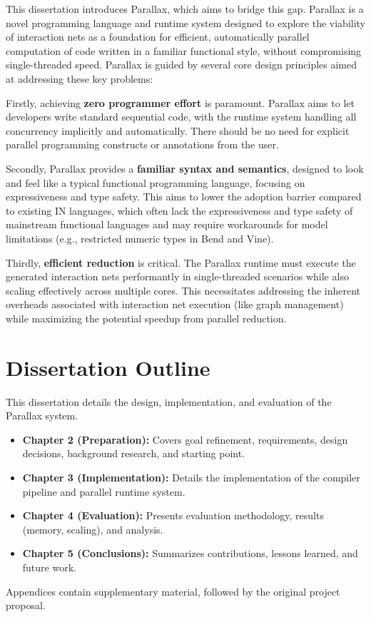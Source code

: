 This dissertation introduces Parallax, which aims to bridge this gap. Parallax is a novel programming language and runtime system designed to explore the viability of interaction nets as a foundation for efficient, automatically parallel computation of code written in a familiar functional style, without compromising single-threaded speed. Parallax is guided by several core design principles aimed at addressing these key problems:

Firstly, achieving \textbf{zero programmer effort} is paramount. Parallax aims to let developers write standard sequential code, with the runtime system handling all concurrency implicitly and automatically. There should be no need for explicit parallel programming constructs or annotations from the user.

Secondly, Parallax provides a \textbf{familiar syntax and semantics}, designed to look and feel like a typical functional programming language, focusing on expressiveness and type safety. This aims to lower the adoption barrier compared to existing IN languages, which often lack the expressiveness and type safety of mainstream functional languages and may require workarounds for model limitations (e.g., restricted numeric types in Bend and Vine).

Thirdly, \textbf{efficient reduction} is critical. The Parallax runtime must execute the generated interaction nets performantly in single-threaded scenarios while also scaling effectively across multiple cores. This necessitates addressing the inherent overheads associated with interaction net execution (like graph management) while maximizing the potential speedup from parallel reduction.

\section{Dissertation Outline}
This dissertation details the design, implementation, and evaluation of the Parallax system. 
\begin{itemize}
    \item \textbf{Chapter 2 (Preparation):} Covers goal refinement, requirements, design decisions, background research, and starting point.
    \item \textbf{Chapter 3 (Implementation):} Details the implementation of the compiler pipeline and parallel runtime system.
    \item \textbf{Chapter 4 (Evaluation):} Presents evaluation methodology, results (memory, scaling), and analysis.
    \item \textbf{Chapter 5 (Conclusions):} Summarizes contributions, lessons learned, and future work.
\end{itemize}
Appendices contain supplementary material, followed by the original project proposal.